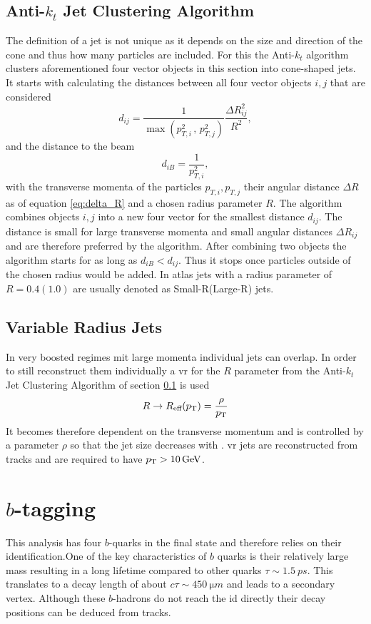 \subsection{Anti-$k_t$ Jet Clustering Algorithm}\label{sec:anti_kt}
The definition of a jet is not unique as it depends on the size and direction of the cone and thus how many particles are included. For this the Anti-$k_t$ algorithm \citep{cacciari2008anti} clusters aforementioned four vector objects in this section into cone-shaped jets. It starts with calculating the distances between all four vector objects $i,j$ that are considered
\begin{equation}
  d_{ij}=\frac{1}{\max(p_{T,i}^{2}\,,\,p_{T,j}^{2})} \frac{\Delta R_{ij}^2}{R^2},
\end{equation}
and the distance to the beam
\begin{equation}
  d_{iB}=\frac{1}{p_{T,i}^{2}},
\end{equation}
with the transverse momenta of the particles $p_{T,i},p_{T,j}$ their angular distance $\Delta R$ as of equation \ref{eq:delta_R} and a chosen radius parameter $R$. The algorithm combines objects $i,j$ into a new four vector for the smallest distance $d_{ij}$. The distance is small for large transverse momenta \pt and small angular distances $\Delta R_{ij}$ and are therefore preferred by the algorithm. After combining two objects the algorithm starts for as long as $d_{iB}<d_{ij}$. Thus it stops once particles outside of the chosen radius would be added. In \ac{atlas} jets with a radius parameter of $R=0.4 (1.0)$ are usually denoted as Small-R(Large-R) jets.


\subsection{Variable Radius Jets}\label{sec:vr_jets}
In very boosted regimes mit large momenta individual jets can overlap. In order to still reconstruct them individually a \ac{vr} for the $R$ parameter from the Anti-$k_t$ Jet Clustering Algorithm of section \ref{sec:anti_kt} is used
\begin{equation}
  R\rightarrow R_\text{eff}(p_{\text{T}})=\frac{\rho}{p_{\text{T}}}
\end{equation}
It becomes therefore dependent on the transverse momentum and is controlled by a parameter $\rho$ so that the jet size decreases with \pt. \ac{vr} jets are reconstructed from tracks and are required to have $p_{\text{T}}>\qty[]{10}{GeV}$.

\section{$b$-tagging}\label{sec:b_tagging}
This analysis has four $b$-quarks in the final state and therefore relies on their identification.One of the key characteristics of $b$ quarks is their relatively large mass resulting in a long lifetime compared to other quarks $\tau\sim\qty{1.5}{ps}$. This translates to a decay length of about $c\tau \sim \qty{450}{\micro m}$ and leads to a secondary vertex. Although these $b$-hadrons do not reach the \ac{id} directly their decay positions can be deduced from tracks.

